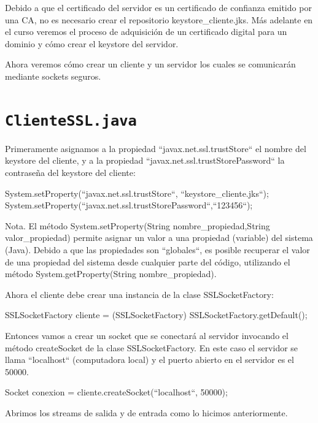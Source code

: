 Debido a que el certificado del servidor es un certificado de confianza emitido por una CA, no es necesario crear el repositorio keystore\_cliente.jks. Más adelante en el curso veremos el proceso de adquisición de un certificado digital para un dominio y cómo crear el keystore del servidor.

Ahora veremos cómo crear un cliente y un servidor los cuales se comunicarán mediante sockets seguros.

\section{\texttt{ClienteSSL.java}}

Primeramente asignamos a la propiedad ``javax.net.ssl.trustStore`` el nombre del keystore del cliente, y a la propiedad ``javax.net.ssl.trustStorePassword`` la contraseña del keystore del cliente:

\begin{SourceCode}
System.setProperty(``javax.net.ssl.trustStore``, ``keystore_cliente.jks``);
System.setProperty(``javax.net.ssl.trustStorePassword``,``123456``);
\end{SourceCode}

Nota. El método System.setProperty(String nombre\_propiedad,String valor\_propiedad) permite asignar un valor a una propiedad (variable) del sistema (Java). Debido a que las propiedades son ``globales``, es posible recuperar el valor de una propiedad del sistema desde cualquier parte del código, utilizando el método System.getProperty(String nombre\_propiedad).

Ahora el cliente debe crear una instancia de la clase SSLSocketFactory:

\begin{SourceCode}
SSLSocketFactory cliente = (SSLSocketFactory) SSLSocketFactory.getDefault();
\end{SourceCode}

Entonces vamos a crear un socket que se conectará al servidor invocando el método createSocket de la clase SSLSocketFactory. En este caso el servidor se llama ``localhost`` (computadora local) y el puerto abierto en el servidor es el 50000.

\begin{SourceCode}
Socket conexion = cliente.createSocket(``localhost``, 50000);
\end{SourceCode}

Abrimos los streams de salida y de entrada como lo hicimos anteriormente.

